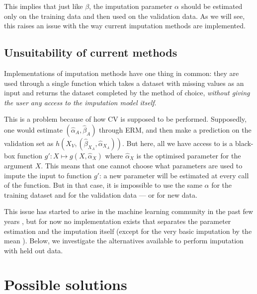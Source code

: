 This implies that just like $\beta$, the imputation parameter $\alpha$ should be estimated only on the training data and then used on the validation data. As we will see, this raises an issue with the way current imputation methods are implemented.

		\subsection{Unsuitability of current methods}
Implementations of imputation methods have one thing in common: they are used through a single function which takes a dataset with missing values as an input and returns the dataset completed by the method of choice, \emph{without giving the user any access to the imputation model itself}. \cite{stekhoven2015missforest} \cite{josse2016missmda}\cite{MICE_founding}\cite{ref_amelia}

This is a problem because of how CV is supposed to be performed. Supposedly, one would estimate $(\hat{\alpha}_A, \hat{\beta}_A)$ through ERM, and then make a prediction on the validation set as $h(X_V,(\hat{\beta}_{X_A},\hat{\alpha}_{X_A}))$. But here, all we have access to is a black-box function $g': X \mapsto g(X, \hat{\alpha}_X)$ where $\hat{\alpha}_X$ is the optimised parameter for the argument $X$. This means that one cannot choose what parameters are used to impute the input to function $g'$: a new parameter will be estimated at every call of the function. But in that case, it is impossible to use the same $\alpha$ for the training dataset and for the validation data --- or for new data.
	
This issue has started to arise in the machine learning community in the past few years \cite{thread_newdata1}\cite{thread_newdata2}\cite{thread_newdata3}, but for now no implementation exists that separates the parameter estimation and the imputation itself (except for the very basic imputation by the mean \cite{mean_imputation}). Below, we investigate the alternatives available to perform imputation with held out data.

	\section{Possible solutions}
	\label{ERM.solutions}
	
